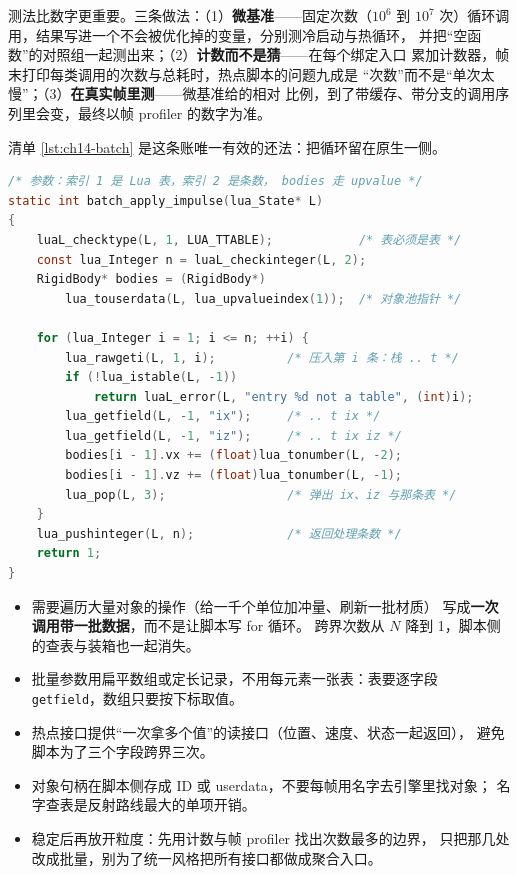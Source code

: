 \documentclass[12pt,a4paper,fontset=fandol]{ctexbook}
\newcommand{\Tp}[1]{\texttt{#1}}
\begin{document}
测法比数字更重要。三条做法：（1）\textbf{微基准}——固定次数（$10^{6}$ 到
$10^{7}$ 次）循环调用，结果写进一个不会被优化掉的变量，分别测冷启动与热循环，
并把``空函数''的对照组一起测出来；（2）\textbf{计数而不是猜}——在每个绑定入口
累加计数器，帧末打印每类调用的次数与总耗时，热点脚本的问题九成是
``次数''而不是``单次太慢''；（3）\textbf{在真实帧里测}——微基准给的相对
比例，到了带缓存、带分支的调用序列里会变，最终以帧 profiler 的数字为准。

清单 \ref{lst:ch14-batch} 是这条账唯一有效的还法：把循环留在原生一侧。

\begin{lstlisting}[language=C, style=cstyle, caption={批量接口：一次跨界处理一整批参数，循环留在 C 这一侧}, label={lst:ch14-batch}]
/* 参数：索引 1 是 Lua 表，索引 2 是条数， bodies 走 upvalue */
static int batch_apply_impulse(lua_State* L)
{
    luaL_checktype(L, 1, LUA_TTABLE);            /* 表必须是表 */
    const lua_Integer n = luaL_checkinteger(L, 2);
    RigidBody* bodies = (RigidBody*)
        lua_touserdata(L, lua_upvalueindex(1));  /* 对象池指针 */

    for (lua_Integer i = 1; i <= n; ++i) {
        lua_rawgeti(L, 1, i);          /* 压入第 i 条：栈 .. t */
        if (!lua_istable(L, -1))
            return luaL_error(L, "entry %d not a table", (int)i);
        lua_getfield(L, -1, "ix");     /* .. t ix */
        lua_getfield(L, -1, "iz");     /* .. t ix iz */
        bodies[i - 1].vx += (float)lua_tonumber(L, -2);
        bodies[i - 1].vz += (float)lua_tonumber(L, -1);
        lua_pop(L, 3);                 /* 弹出 ix、iz 与那条表 */
    }
    lua_pushinteger(L, n);             /* 返回处理条数 */
    return 1;
}
\end{lstlisting}

\begin{bestpractice}[title={把循环留在原生一侧，只暴露批量接口}]
\begin{itemize}
  \item 需要遍历大量对象的操作（给一千个单位加冲量、刷新一批材质）
        写成\textbf{一次调用带一批数据}，而不是让脚本写 for 循环。
        跨界次数从 $N$ 降到 1，脚本侧的查表与装箱也一起消失。
  \item 批量参数用扁平数组或定长记录，不用每元素一张表：表要逐字段
        \Tp{getfield}，数组只要按下标取值。
  \item 热点接口提供``一次拿多个值''的读接口（位置、速度、状态一起返回），
        避免脚本为了三个字段跨界三次。
  \item 对象句柄在脚本侧存成 ID 或 userdata，不要每帧用名字去引擎里找对象；
        名字查表是反射路线最大的单项开销。
  \item 稳定后再放开粒度：先用计数与帧 profiler 找出次数最多的边界，
        只把那几处改成批量，别为了统一风格把所有接口都做成聚合入口。
\end{itemize}
\end{bestpractice}
\end{document}
